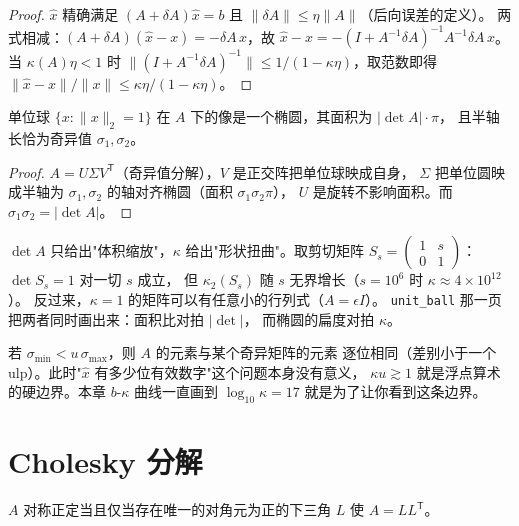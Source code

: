 \begin{proof}
$\hat x$ 精确满足 $(A+\delta A)\hat x=b$ 且 $\|\delta A\|\le\eta\|A\|$（后向误差的定义）。
两式相减：$(A+\delta A)(\hat x-x)=-\delta A\,x$，故
$\hat x-x=-(I+A^{-1}\delta A)^{-1}A^{-1}\delta A\,x$。当 $\kappa(A)\eta<1$ 时
$\|(I+A^{-1}\delta A)^{-1}\|\le1/(1-\kappa\eta)$，取范数即得
$\|\hat x-x\|/\|x\|\le\kappa\eta/(1-\kappa\eta)$。
\end{proof}

\begin{theorem}[单位球像的面积]
\label{thm:ball}
单位球 $\{x:\|x\|_2=1\}$ 在 $A$ 下的像是一个椭圆，其面积为 $|\det A|\cdot\pi$，
且半轴长恰为奇异值 $\sigma_1,\sigma_2$。
\end{theorem}

\begin{proof}
$A=U\Sigma V^{\mathsf T}$（奇异值分解），$V$ 是正交阵把单位球映成自身，
$\Sigma$ 把单位圆映成半轴为 $\sigma_1,\sigma_2$ 的轴对齐椭圆（面积 $\sigma_1\sigma_2\pi$），
$U$ 是旋转不影响面积。而 $\sigma_1\sigma_2=|\det A|$。
\end{proof}

\begin{remark}
\label{rem:det}
$\det A$ 只给出"体积缩放"，$\kappa$ 给出"形状扭曲"。取剪切矩阵
$S_s=\begin{pmatrix}1&s\\0&1\end{pmatrix}$：$\det S_s=1$ 对一切 $s$ 成立，
但 $\kappa_2(S_s)$ 随 $s$ 无界增长（$s=10^6$ 时 $\kappa\approx4\times10^{12}$）。
反过来，$\kappa=1$ 的矩阵可以有任意小的行列式（$A=\epsilon I$）。
\texttt{unit\_\allowbreak{}ball} 那一页把两者同时画出来：面积比对拍 $|\det|$，
而椭圆的扁度对拍 $\kappa$。
\end{remark}

\begin{remark}
若 $\sigma_{\min}<u\,\sigma_{\max}$，则 $A$ 的元素与某个奇异矩阵的元素
逐位相同（差别小于一个 ulp）。此时"$\hat x$ 有多少位有效数字"这个问题本身没有意义，
$\kappa u\gtrsim1$ 就是浮点算术的硬边界。本章 $b$-$\kappa$ 曲线一直画到
$\log_{10}\kappa=17$ 就是为了让你看到这条边界。
\end{remark}

\section{Cholesky 分解}

\begin{theorem}[存在唯一性]
\label{thm:chol}
$A$ 对称正定当且仅当存在唯一的对角元为正的下三角 $L$ 使 $A=LL^{\mathsf T}$。
\end{theorem}

